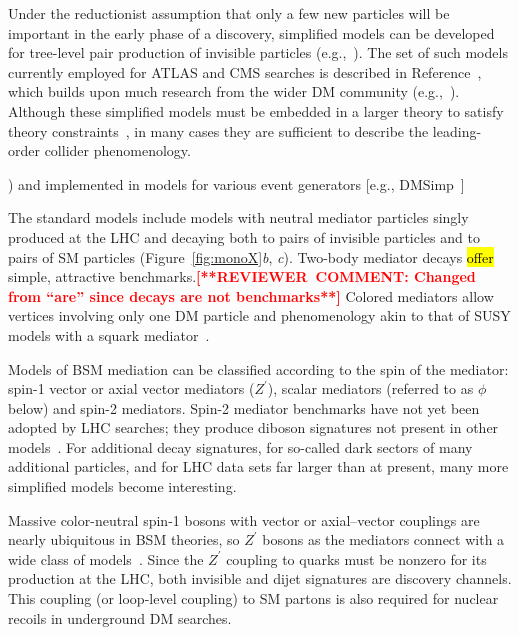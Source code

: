 \documentclass{ar-1col}
\newcommand{\IP}{invisible particle}
\newcommand{\Zprime}{\ensuremath{{Z}^\prime}\xspace}
\begin{document}
Under the reductionist assumption that only a few new particles
will be important in the early phase of a discovery, simplified
models can be developed for tree-level pair production of {\IP}s
(e.g.,~). The set of such models
currently employed for ATLAS and CMS searches is described in
Reference~, which builds upon much research from
the wider DM community
(e.g.,~). Although these simplified
models must be embedded in a larger theory to satisfy theory
constraints~\cite{Kahlhoefer:2015bea}, in many cases they are sufficient to
describe the leading-order collider phenomenology.

\begin{marginnote}[]
)
and implemented in models for various event generators [e.g.,
DMSimp~\cite{Backovic:2015soa}]
\end{marginnote}

The standard models include models with neutral mediator particles
singly produced at the LHC and decaying both to pairs of {\IP}s and to
pairs of SM particles (Figure~\ref{fig:monoX}{\em b},{\em
c}). Two-body mediator decays \hl{offer} simple, attractive benchmarks.\textbf{\textcolor{red}{[**REVIEWER\ COMMENT: Changed from ``are'' since decays are not benchmarks**]}}
Colored mediators allow vertices involving only one DM particle
and phenomenology akin to that of SUSY models with a squark
mediator~\cite{Papucci:2014iwa,An:2013xka,Bell:2012rg}.

Models of BSM mediation can be classified according to the spin of
the mediator: spin-1 vector or axial vector mediators (\Zprime),
scalar mediators (referred to as $\phi$ below) and spin-2
mediators. Spin-2 mediator benchmarks have not yet been adopted by
LHC searches; they produce diboson signatures not present in other
models~\cite{Han:2015cty}.
For additional decay signatures, for so-called dark sectors of many
additional particles, and for LHC data sets far larger than at
present, many more simplified models become interesting.

{Massive color-neutral spin-1 bosons with vector or
axial--vector couplings} are nearly ubiquitous in BSM theories, so
\Zprime bosons as the mediators connect with a wide class of
models~\cite{Shoemaker:2011vi}. Since the \Zprime coupling to
quarks must be nonzero for its production at the LHC, both
invisible and dijet signatures are discovery channels. This
coupling (or loop-level coupling) to SM partons is also required
for nuclear recoils in underground DM searches.
\end{document}

